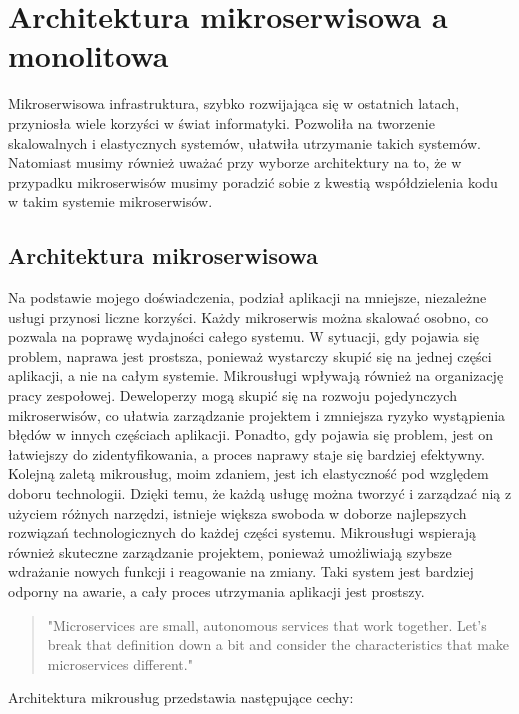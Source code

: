 \documentclass[runningheads,12pt]{llncs}
\begin{document}
\newpage

\section{Architektura mikroserwisowa a monolitowa}

Mikroserwisowa infrastruktura, szybko rozwijająca się w ostatnich latach, przyniosła wiele korzyści w świat informatyki. Pozwoliła na tworzenie skalowalnych i elastycznych systemów, ułatwiła utrzymanie takich systemów. Natomiast musimy również uważać przy wyborze architektury na to, że w przypadku mikroserwisów musimy poradzić sobie z kwestią współdzielenia kodu w takim systemie mikroserwisów.

\subsection{Architektura mikroserwisowa}

Na podstawie mojego doświadczenia, podział aplikacji na mniejsze, niezależne usługi przynosi liczne korzyści. Każdy mikroserwis można skalować osobno, co pozwala na poprawę wydajności całego systemu. W sytuacji, gdy pojawia się problem, naprawa jest prostsza, ponieważ wystarczy skupić się na jednej części aplikacji, a nie na całym systemie. Mikrousługi wpływają również na organizację pracy zespołowej. Deweloperzy mogą skupić się na rozwoju pojedynczych mikroserwisów, co ułatwia zarządzanie projektem i zmniejsza ryzyko wystąpienia błędów w innych częściach aplikacji. Ponadto, gdy pojawia się problem, jest on łatwiejszy do zidentyfikowania, a proces naprawy staje się bardziej efektywny. Kolejną zaletą mikrousług, moim zdaniem, jest ich elastyczność pod względem doboru technologii. Dzięki temu, że każdą usługę można tworzyć i zarządzać nią z użyciem różnych narzędzi, istnieje większa swoboda w doborze najlepszych rozwiązań technologicznych do każdej części systemu. Mikrousługi wspierają również skuteczne zarządzanie projektem, ponieważ umożliwiają szybsze wdrażanie nowych funkcji i reagowanie na zmiany. Taki system jest bardziej odporny na awarie, a cały proces utrzymania aplikacji jest prostszy.
\begin{quote}
    "Microservices are small, autonomous services that work together. Let’s break that definition down a bit and consider the characteristics that make microservices different."~\cite[p. 2]{newman2015building}
\end{quote}

Architektura mikrousług przedstawia następujące cechy:
\end{document}
